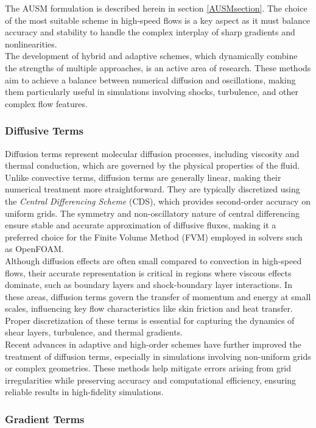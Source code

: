 \documentclass[a5paper]{sapthesis}
\begin{document}
	The AUSM formulation is described herein in section \ref{AUSMsection}. The choice of the most suitable scheme in high-speed flows is a key aspect as it must balance accuracy and stability to handle the complex interplay of sharp gradients and nonlinearities. 
	\\
	The development of hybrid and adaptive schemes, which dynamically combine the strengths of multiple approaches, is an active area of research. These methods aim to achieve a balance between numerical diffusion and oscillations, making them particularly useful in simulations involving shocks, turbulence, and other complex flow features.
	
	\subsubsection{Diffusive Terms}
	Diffusion terms represent molecular diffusion processes, including viscosity and thermal conduction, which are governed by the physical properties of the fluid. Unlike convective terms, diffusion terms are generally linear, making their numerical treatment more straightforward. They are typically discretized using the \textit{Central Differencing Scheme} (CDS), which provides second-order accuracy on uniform grids. The symmetry and non-oscillatory nature of central differencing ensure stable and accurate approximation of diffusive fluxes, making it a preferred choice for the Finite Volume Method (FVM) employed in solvers such as OpenFOAM.
	\\
	Although diffusion effects are often small compared to convection in high-speed flows, their accurate representation is critical in regions where viscous effects dominate, such as boundary layers and shock-boundary layer interactions. In these areas, diffusion terms govern the transfer of momentum and energy at small scales, influencing key flow characteristics like skin friction and heat transfer. Proper discretization of these terms is essential for capturing the dynamics of shear layers, turbulence, and thermal gradients.
	\\
	Recent advances in adaptive and high-order schemes have further improved the treatment of diffusion terms, especially in simulations involving non-uniform grids or complex geometries. These methods help mitigate errors arising from grid irregularities while preserving accuracy and computational efficiency, ensuring reliable results in high-fidelity simulations.
	
	
	\subsubsection{Gradient Terms}
	
\end{document}
